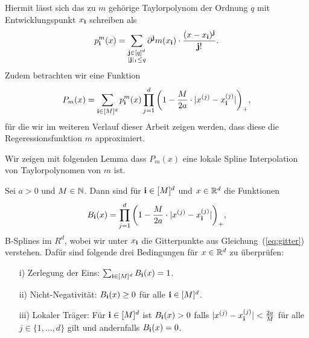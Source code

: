 Hiermit lässt sich das zu $m$ gehörige Taylorpolynom der Ordnung $q$ mit Entwicklungspunkt $x_{\mathbf{i}}$ schreiben als
$$p_{\mathbf{i}}^m(x) = \sum_{\substack{\mathbf{j} \in [q]^d \\|\mathbf{j}|_1 \leq q}} \partial^{\mathbf{j}}m(x_{\mathbf{i}}) \cdot \frac{(x - x_{\mathbf{i}})^{\mathbf{j}}}{\mathbf{j}!}.$$
Zudem betrachten wir eine Funktion
\begin{equation}
\label{konvexkomb}
P_m(x) = \sum_{\mathbf{i} \in [M]^d} p_{\mathbf{i}}^m(x) \prod_{j = 1}^{d} \bigg(1 - \frac{M}{2a} \cdot |x^{(j)} - x_{\mathbf{i}}^{(j)}|\bigg)_+,
\end{equation}
für die wir im weiteren Verlauf dieser Arbeit zeigen werden, dass diese die Regeressionsfunktion $m$ approximiert.

Wir zeigen mit folgenden Lemma dass $P_m(x)$ eine lokale Spline Interpolation von Taylorpolynomen von $m$ ist.
\begin{lem}
\label{lem:loccon}
Sei $a >0$ und $M \in \mathbb{N}$. Dann sind für $\mathbf{i} \in [M]^d$ und $x \in \mathbb{R}^d$ die Funktionen 
$$B_{\mathbf{i}}(x) = \prod_{j = 1}^{d} \bigg(1 - \frac{M}{2a} \cdot |x^{(j)} - x_{\mathbf{i}}^{(j)}|\bigg)_+,$$
B-Splines im $R^d$, wobei wir unter $x_{\mathbf{i}}$ die Gitterpunkte aus Gleichung~(\ref{eq:gitter}) verstehen. Dafür sind folgende drei Bedingungen für $x \in \mathbb{R}^d$ zu überprüfen:
\begin{itemize}
\item[i)] Zerlegung der Eins: $\sum_{\mathbf{i} \in [M]^d} B_{\mathbf{i}}(x) = 1$.
\item[ii)] Nicht-Negativität: $B_{\mathbf{i}}(x) \geq 0$ für alle $\mathbf{i} \in [M]^d$.
\item[iii)] Lokaler Träger: Für $\mathbf{i} \in [M]^d$ ist $B_{\mathbf{i}}(x) > 0$ falls $|x^{(j)} - x_{\mathbf{i}}^{(j)}| < \frac{2a}{M}$ für alle $j \in \{1,\dots,d\}$ gilt und andernfalls $B_{\mathbf{i}}(x) = 0$.
\end{itemize}
\end{lem}
